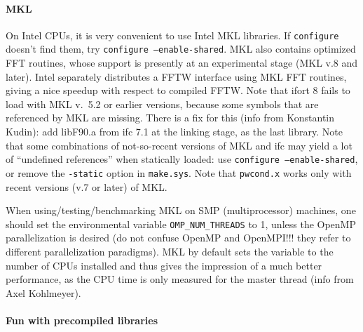 \documentclass[12pt,a4paper]{article}
\begin{document}
\paragraph{MKL}

On Intel CPUs, it is very convenient to use Intel MKL libraries.
If \texttt{configure} doesn't find them, try
\texttt{configure --enable-shared}.
MKL also contains optimized FFT routines, whose support is presently
at an experimental stage (MKL v.8 and later). Intel separately
distributes a FFTW interface using MKL FFT routines, giving a nice
speedup with respect to compiled FFTW.
Note that ifort 8 fails to load with MKL v.~5.2 or earlier versions,
because some symbols that are referenced by MKL are missing. There
is a fix for this (info from Konstantin Kudin): add libF90.a from 
ifc 7.1 at the linking stage, as the last library.
Note that some combinations of not-so-recent versions of MKL 
and ifc may yield a lot of ``undefined references'' when statically 
loaded: use \texttt{configure --enable-shared}, 
or remove the \texttt{-static} option in \texttt{make.sys}.
Note that \texttt{pwcond.x} works only with recent versions
(v.7 or later) of MKL.

When using/testing/benchmarking MKL on SMP (multiprocessor)
machines, one should set the environmental variable 
\texttt{OMP\_NUM\_THREADS} to 1, unless the OpenMP 
parallelization is desired (do not confuse OpenMP and OpenMPI!!!
they refer to different parallelization paradigms). 
MKL by default sets the variable to the number of CPUs installed and 
thus gives the impression of a much better performance, as the CPU time
is only measured for the master thread (info from Axel Kohlmeyer).

\paragraph{Fun with precompiled libraries}
\end{document}
